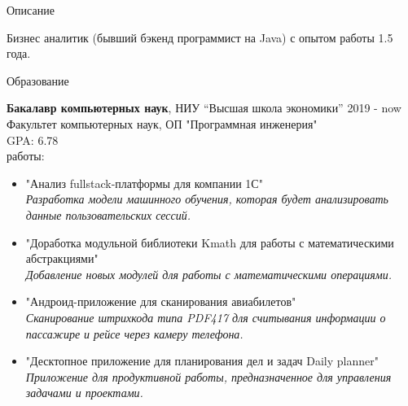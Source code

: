 \documentclass{resume}
\begin{document}

\begin{rSection}{Описание}

{Бизнес аналитик (бывший бэкенд программист на Java) с опытом работы 1.5 года.}


\end{rSection}

\begin{rSection}{Образование}

{\bf Бакалавр компьютерных наук},   НИУ “Высшая школа экономики”  \hfill {2019 - now}  \\
Факультет компьютерных наук, ОП "Программная инженерия" \\
GPA: 6.78 \\
{ работы}: 
 \begin{itemize}
    \itemsep -3pt {} 
     \item "Анализ fullstack-платформы для компании 1С" \\\textit{Разработка модели машинного обучения, которая будет анализировать данные пользовательских сессий.}
     \item "Доработка модульной библиотеки Kmath для работы с математическими абстракциями" \\\textit{Добавление новых модулей для работы с математическими операциями.}
    \item "Андроид-приложение для сканирования авиабилетов" \\\textit{Сканирование штрихкода типа PDF417 для считывания информации о пассажире и рейсе через камеру телефона.} 
       \item "Десктопное приложение для планирования дел и задач Daily planner" \\\textit{Приложение для продуктивной работы, предназначенное для управления задачами и проектами.}
\end{itemize}



\end{rSection}
\end{document}
